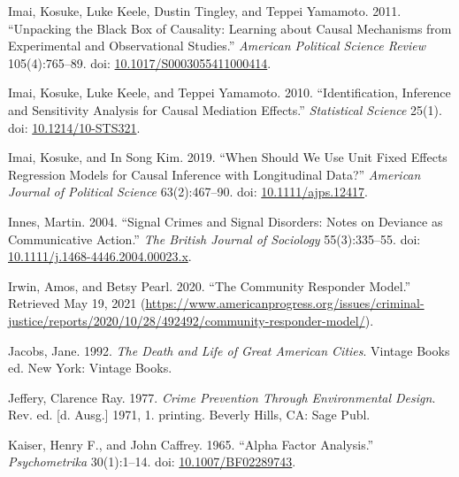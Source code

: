 \documentclass [11pt, proquest] {uwthesis}[2015/03/03]
\newlength{\cslhangindent}
\newenvironment{CSLReferences}[2]%
{\setlength{\parindent}{0pt}%
\everypar{\setlength{\hangindent}{\cslhangindent}}\ignorespaces}%
{\par}
\begin{document}
\begin{CSLReferences}{1}{0}
\leavevmode\hypertarget{ref-imaiUnpackingBlackBox2011}{}%
Imai, Kosuke, Luke Keele, Dustin Tingley, and Teppei Yamamoto. 2011. {``Unpacking the {Black Box} of {Causality}: {Learning} about {Causal Mechanisms} from {Experimental} and {Observational Studies}.''} \emph{American Political Science Review} 105(4):765--89. doi: \href{https://doi.org/10.1017/S0003055411000414}{10.1017/S0003055411000414}.

\leavevmode\hypertarget{ref-imaiIdentificationInferenceSensitivity2010}{}%
Imai, Kosuke, Luke Keele, and Teppei Yamamoto. 2010. {``Identification, {Inference} and {Sensitivity Analysis} for {Causal Mediation Effects}.''} \emph{Statistical Science} 25(1). doi: \href{https://doi.org/10.1214/10-STS321}{10.1214/10-STS321}.

\leavevmode\hypertarget{ref-imaiWhenShouldWe2019}{}%
Imai, Kosuke, and In Song Kim. 2019. {``When {Should We Use Unit Fixed Effects Regression Models} for {Causal Inference} with {Longitudinal Data}?''} \emph{American Journal of Political Science} 63(2):467--90. doi: \href{https://doi.org/10.1111/ajps.12417}{10.1111/ajps.12417}.

\leavevmode\hypertarget{ref-innesSignalCrimesSignal2004}{}%
Innes, Martin. 2004. {``Signal {Crimes} and {Signal Disorders}: {Notes} on {Deviance} as {Communicative Action}.''} \emph{The British Journal of Sociology} 55(3):335--55. doi: \href{https://doi.org/10.1111/j.1468-4446.2004.00023.x}{10.1111/j.1468-4446.2004.00023.x}.

\leavevmode\hypertarget{ref-irwinCommunityResponderModel2020}{}%
Irwin, Amos, and Betsy Pearl. 2020. {``The {Community Responder Model}.''} Retrieved May 19, 2021 (\url{https://www.americanprogress.org/issues/criminal-justice/reports/2020/10/28/492492/community-responder-model/}).

\leavevmode\hypertarget{ref-jacobsDeathLifeGreat1992}{}%
Jacobs, Jane. 1992. \emph{The Death and Life of Great {American} Cities}. Vintage Books ed. {New York}: {Vintage Books}.

\leavevmode\hypertarget{ref-jefferyCrimePreventionEnvironmental1977}{}%
Jeffery, Clarence Ray. 1977. \emph{Crime {Prevention} Through {Environmental Design}}. Rev. ed. {[}d. Ausg.{]} 1971, 1. printing. {Beverly Hills, CA}: {Sage Publ}.

\leavevmode\hypertarget{ref-kaiserAlphaFactorAnalysis1965}{}%
Kaiser, Henry F., and John Caffrey. 1965. {``Alpha Factor Analysis.''} \emph{Psychometrika} 30(1):1--14. doi: \href{https://doi.org/10.1007/BF02289743}{10.1007/BF02289743}.


\end{CSLReferences}
\end{document}
